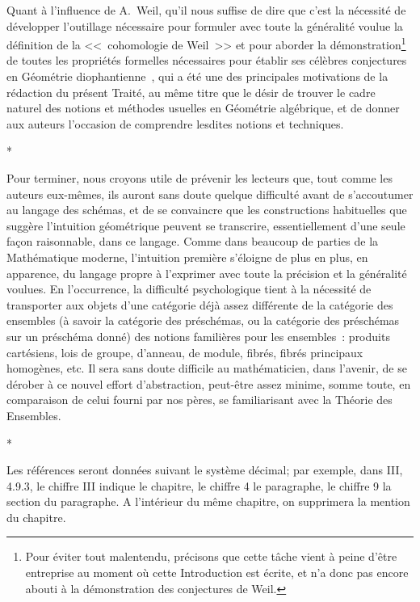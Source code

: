 Quant à l'influence de A.~Weil, qu'il nous suffise de dire que c'est la nécessité de développer l'outillage nécessaire pour formuler avec toute la généralité voulue la définition de la <<~cohomologie de Weil~>> et pour aborder la démonstration\footnote{Pour éviter tout malentendu, précisons que cette tâche vient à peine d'être entreprise au moment où cette Introduction est écrite, et n'a donc pas encore abouti à la démonstration des conjectures de Weil.} de toutes les propriétés formelles nécessaires pour établir ses célèbres conjectures en Géométrie diophantienne~\cite{I-19}, qui a été une des principales motivations de la rédaction du présent Traité, au même titre que le désir de trouver le cadre naturel des notions et méthodes usuelles en Géométrie algébrique, et de donner aux auteurs l'occasion de comprendre lesdites notions et techniques.

\bigskip
\begin{center}*\quad*\quad*\end{center}
\bigskip

Pour terminer, nous croyons utile de prévenir les lecteurs que, tout comme les auteurs eux-mêmes, ils auront sans doute quelque difficulté avant de s'accoutumer au langage des schémas, et de se convaincre que les constructions habituelles que suggère l'intuition géométrique peuvent se transcrire, essentiellement d'une seule façon raisonnable, dans ce langage.
Comme dans beaucoup de parties de la Mathématique moderne, l'intuition première s'éloigne de plus en plus, en apparence, du langage propre à l'exprimer avec toute la précision et la généralité voulues.
En l'occurrence, la difficulté psychologique tient à la nécessité de transporter aux objets d'une catégorie déjà assez différente de la catégorie des ensembles (à savoir la catégorie des préschémas, ou la catégorie des préschémas sur un préschéma donné) des notions familières pour les ensembles~: produits cartésiens, lois de groupe, d'anneau, de module, fibrés, fibrés principaux homogènes, etc.
Il sera sans doute difficile au mathématicien, dans l'avenir, de se dérober à ce nouvel effort d'abstraction, peut-être assez minime, somme toute, en comparaison de celui fourni par nos pères, se familiarisant avec la Théorie des Ensembles.

\bigskip
\begin{center}*\quad*\quad*\end{center}
\bigskip

Les références seront données suivant le système décimal; par exemple, dans III, 4.9.3, le chiffre III indique le chapitre, le chiffre 4 le paragraphe, le chiffre 9 la section du paragraphe.
A l'intérieur du même chapitre, on supprimera la mention du chapitre.
